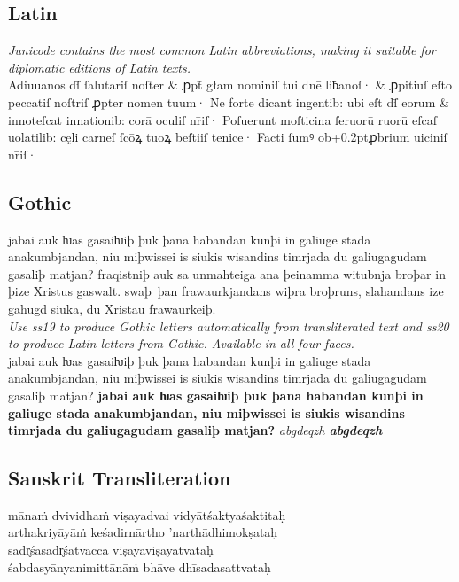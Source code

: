 \documentclass[12pt,a4paper,openany]{book}
\begin{document}
\subsection*{Latin}

{\small\itshape Junicode contains the most common Latin abbreviations,
  making it suitable for diplomatic editions of Latin texts.}\\[1ex]
{Adiuuanos dſ̄ ſalutariſ noſter \&
 ꝓpt̄ głam nominiſ tui dnē liƀanoſ· \& ꝓpitiuſ eſto peccatiſ noſtriſ
 ꝓpter nomen tuum· Ne forte dicant ingentib: ubi eſt dſ̄ eorum \&
  innoteſcat innationib: corā oculiſ nr̄iſ· Poſuerunt moſticina
  ſeruorū ruorū eſcaſ uolatilib: cęli carneſ ſcōꝝ tuoꝝ beſtiiſ tenice·
  Facti ſumꝰ ob\kern+0.2ptꝓbrium uiciniſ nr̄iſ·}

\subsection*{Gothic}

jabai auk ƕas gasaiƕiþ þuk þana habandan kunþi in galiuge stada
anakumbjandan, niu miþwissei is siukis wis\-an\-dins timrjada du
galiugagudam gasaliþ matjan?  fraqistniþ auk sa unmahteiga ana
þeinamma witubnja broþar in þize Xristus gaswalt.  swaþ~þan
frawaurkjandans wiþra broþruns, slahandans ize gahugd siuka, du
Xristau fra\-waur\-keiþ.\\

{\noindent\small\itshape Use ss19 to produce Gothic letters
  automatically from transliterated text and ss20 to produce Latin
  letters from Gothic. Available in all four faces.}\\[1ex]
{jabai auk ƕas gasaiƕiþ þuk þana
  habandan kunþi in ga\-liuge stada anakumbjandan, niu miþwissei is
  siukis wis\-an\-dins timrjada du galiugagudam gasaliþ matjan?
  {\bfseries jabai auk ƕas gasaiƕiþ þuk þana habandan kunþi in
    ga\-liuge stada anakumbjandan, niu miþwissei is siukis
    wis\-an\-dins timrjada du galiugagudam gasaliþ matjan?}
  \textit{abgdeqzh \bfseries abgdeqzh}}

\subsection*{Sanskrit Transliteration}

\noindent mānaṁ dvividhaṁ viṣayadvai vidyātśaktyaśaktitaḥ \\
     arthakriyāyāṁ keśadirnārtho ’narthādhimokṣataḥ\\[1ex]
sadr̥śāsadr̥śatvācca viṣayāviṣayatvataḥ \\
     śabdasyānyanimittānāṁ bhāve dhīsadasattvataḥ
\end{document}
